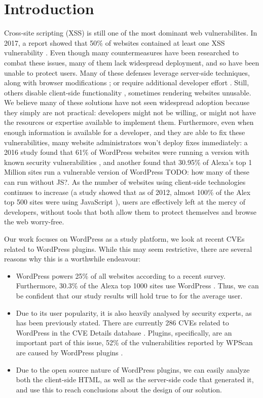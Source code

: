 \section{Introduction}

Cross-site scripting (XSS) is still one of the most dominant web vulnerabilites. In 2017, a report showed that 50\% of websites contained at least one XSS vulnerability \cite{Acunetix}. Even though many countermeasures have been researched to combat these issues, many of them lack widespread deployment, and so have been unable to protect users. Many of these defenses leverage server-side techniques, along with browser modifications \cite{Jim:2007:DSI:1242572.1242654,Nadji:2009}; or require additional developer effort \cite{10.1007/978-3-319-66399-9_7}. Still, others disable client-side functionality \cite{Noscript,Snyder:2017:MWD:3133956.3133966}, sometimes rendering websites unusable. We believe many of these solutions have not seen widespread adoption because they simply are not practical: developers might not be willing, or might not have the resources or expertise available to implement them. Furthermore, even when enough information is available for a developer, and they are able to fix these vulnerabilities, many website administrators won't deploy fixes immediately: a 2016 study found that 61\% of WordPress websites were running a version with known security vulnerabilities \cite{Sucuri}, and another found that 30.95\% of Alexa's top 1 Million sites run a vulnerable version of WordPress \cite{wpwhitesecurity} TODO: how many of these can run without JS?. As the number of websites using client-side technologies continues to increase (a study showed that as of 2012, almost 100\% of the Alex top 500 sites were using JavaScript \cite{Stock:2017:WTI:3241189.3241265}), users are effectively left at the mercy of developers, without tools that both allow them to protect themselves and browse the web worry-free.

Our work focuses on WordPress as a study platform, we look at recent CVEs related to WordPress plugins. While this may seem restrictive, there are several reasons why this is a worthwhile endeavour:
\begin{itemize}
	\item WordPress powers 25\% of all websites according to a recent survey. Furthermore, 30.3\% of the Alexa top 1000 sites use WordPress \cite{w3techs}. Thus, we can be confident that our study results will hold true to for the average user.
	\item Due to its user popularity, it is also heavily analysed by security experts, as has been previously stated. There are currently 286 CVEs related to WordPress in the CVE Details database \cite{cvedetails}. Plugins, specifically, are an important part of this issue, 52\% of the vulnerabilities reported by WPScan are caused by WordPress plugins \cite{wpscan}.
	\item Due to the open source nature of WordPress plugins, we can easily analyze both the client-side HTML, as well as the server-side code that generated it, and use this to reach conclusions about the design of our solution.
	
\end{itemize}

